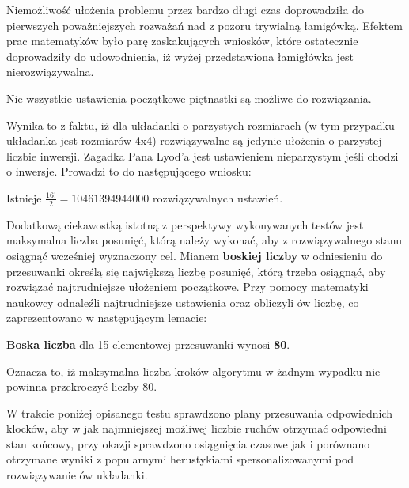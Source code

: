         Niemożliwość ułożenia problemu przez bardzo długi czas doprowadziła do pierwszych poważniejszych rozważań 
        nad z pozoru trywialną łamigówką. Efektem prac matematyków było parę zaskakujących wniosków, które ostatecznie doprowadziły 
        do udowodnienia, iż wyżej przedstawiona łamigłówka jest nierozwiązywalna.
        \begin{lemma}
            Nie wszystkie ustawienia początkowe piętnastki są możliwe do rozwiązania.\cite{Fifteen}
        \end{lemma}
        Wynika to z faktu, iż dla układanki o parzystych rozmiarach (w tym przypadku układanka jest rozmiarów 4x4)
        rozwiązywalne są jedynie ułożenia o parzystej liczbie inwersji. Zagadka Pana Lyod'a jest 
        ustawieniem nieparzystym jeśli chodzi o inwersje. Prowadzi to do następującego wniosku:
        \begin{corollary}
            Istnieje $\frac{16!}{2}=10 461 394 944 000$ rozwiązywalnych ustawień. 
        \end{corollary}
        Dodatkową ciekawostką istotną z perspektywy wykonywanych testów jest maksymalna liczba posunięć, którą należy wykonać, 
        aby z rozwiązywalnego stanu osiągnąć wcześniej wyznaczony cel. Mianem \textbf{boskiej liczby} w odniesieniu do przesuwanki
        określą się największą liczbę posunięć, którą trzeba osiągnąć, aby rozwiązać najtrudniejsze ułożeniem początkowe. Przy pomocy matematyki 
        naukowcy odnaleźli najtrudniejsze ustawienia oraz obliczyli ów liczbę, co zaprezentowano w następującym lemacie:
        \begin{lemma}
            \textbf{Boska liczba} dla 15-elementowej przesuwanki wynosi \textbf{80}. \cite{80Moves}
        \end{lemma}
        Oznacza to, iż maksymalna liczba kroków algorytmu w żadnym wypadku nie powinna przekroczyć liczby 80.

        W trakcie poniżej opisanego testu sprawdzono plany przesuwania odpowiednich klocków, aby w jak najmniejszej możliwej liczbie ruchów
        otrzymać odpowiedni stan końcowy, przy okazji sprawdzono osiągnięcia czasowe jak i porównano otrzymane wyniki z popularnymi herustykiami 
        spersonalizowanymi pod rozwiązywanie ów układanki.

